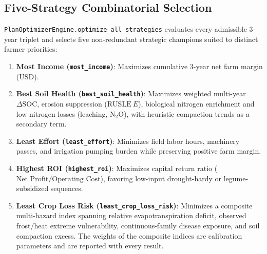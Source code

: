 \subsection{Five-Strategy Combinatorial Selection}
\texttt{PlanOptimizerEngine.optimize\_all\_strategies} evaluates every admissible 3-year triplet and selects five non-redundant strategic champions suited to distinct farmer priorities:
\begin{enumerate}[leftmargin=1.5em]
  \item \textbf{Most Income (\texttt{most\_income})}: Maximizes cumulative 3-year net farm margin ($\mathrm{USD}$).
  \item \textbf{Best Soil Health (\texttt{best\_soil\_health})}: Maximizes weighted multi-year $\Delta\mathrm{SOC}$, erosion suppression ($\mathrm{RUSLE}~E$), biological nitrogen enrichment and low nitrogen losses (leaching, N$_2$O), with heuristic compaction trends as a secondary term.
  \item \textbf{Least Effort (\texttt{least\_effort})}: Minimizes field labor hours, machinery passes, and irrigation pumping burden while preserving positive farm margin.
  \item \textbf{Highest ROI (\texttt{highest\_roi})}: Maximizes capital return ratio ($\text{Net Profit} / \text{Operating Cost}$), favoring low-input drought-hardy or legume-subsidized sequences.
  \item \textbf{Least Crop Loss Risk (\texttt{least\_crop\_loss\_risk})}: Minimizes a composite multi-hazard index spanning relative evapotranspiration deficit, observed frost/heat extreme vulnerability, continuous-family disease exposure, and soil compaction excess. The weights of the composite indices are calibration parameters and are reported with every result.
\end{enumerate}
